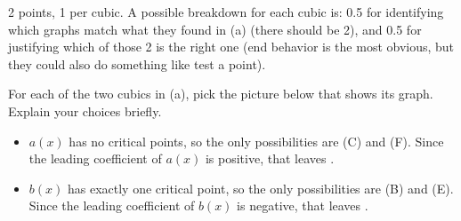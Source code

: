 \documentclass{article}
\begin{document}
\begin{enumerate}
\begin{enumerate}
    \begin{grading}
      2 points, 1 per cubic. A possible breakdown for each cubic is: 0.5 for identifying which graphs match what they found in (a) (there should be 2), and 0.5 for justifying which of those 2 is the right one (end behavior is the most obvious, but they could also do something like test a point).
    \end{grading}

    \begin{problem}
      For each of the two cubics in (a), pick the picture below that shows its graph. Explain your choices briefly. 
    \end{problem}

    \begin{solution}
      \begin{itemize}
        \item $a(x)$ has no critical points, so the only possibilities
        are (C) and (F). Since the leading coefficient of $a(x)$ is
        positive, that leaves .
        \item $b(x)$ has exactly one critical point, so
        the only possibilities are (B) and (E). Since the leading
        coefficient of $b(x)$ is negative, that leaves .
      \end{itemize}
    \end{solution}


\end{enumerate}
\end{enumerate}
\end{document}
